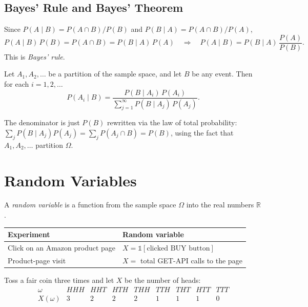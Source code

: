 \documentclass[11pt]{article}
\begin{document}
\subsection{Bayes' Rule and Bayes' Theorem}

Since $P(A \mid B) = P(A \cap B)/P(B)$ and $P(B \mid A) = P(A \cap B)/P(A)$,
\[
  P(A \mid B)\, P(B) = P(A \cap B) = P(B \mid A) \, P(A)
  \quad\Longrightarrow\quad
  P(A \mid B) = P(B \mid A)\, \frac{P(A)}{P(B)}.
\]
This is \emph{Bayes' rule}.

\begin{theorem}
Let $A_1, A_2, \dots$ be a partition of the sample space, and let $B$ be any
event. Then for each $i = 1, 2, \dots$
\[
  P(A_i \mid B) = \frac{P(B \mid A_i) \, P(A_i)}{\sum_{j=1}^\infty P(B \mid
  A_j) \, P(A_j)}.
\]
\end{theorem}

The denominator is just $P(B)$ rewritten via the law of total probability:
$\sum_j P(B \mid A_j) P(A_j) = \sum_j P(A_j \cap B) = P(B)$, using the fact
that $A_1, A_2, \dots$ partition $\Omega$.

\section{Random Variables}

\begin{definition}
A \emph{random variable} is a function from the sample space $\Omega$ into
the real numbers $\mathbb{R}$.
\end{definition}

\begin{center}
\begin{tabular}{ll}
\hline
Experiment & Random variable \\
\hline
Click on an Amazon product page & $X = \mathbb{1}[\text{clicked BUY button}]$ \\
Product-page visit & $X = $ total GET-API calls to the page \\
\hline
\end{tabular}
\end{center}

\begin{example}
Toss a fair coin three times and let $X$ be the number of heads:
\[
\begin{array}{c|cccccccc}
\omega & HHH & HHT & HTH & THH & TTH & THT & HTT & TTT \\
\hline
X(\omega) & 3 & 2 & 2 & 2 & 1 & 1 & 1 & 0
\end{array}
\]
\end{example}
\end{document}
